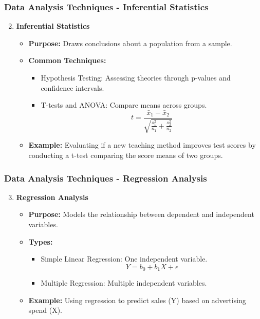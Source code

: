 \documentclass[aspectratio=169]{beamer}
\begin{document}
\begin{frame}[fragile]
    \frametitle{Data Analysis Techniques - Inferential Statistics}
    \begin{enumerate}
        \setcounter{enumi}{1}
        \item \textbf{Inferential Statistics}
        \begin{itemize}
            \item \textbf{Purpose:} Draws conclusions about a population from a sample.
            \item \textbf{Common Techniques:}
            \begin{itemize}
                \item Hypothesis Testing: Assessing theories through p-values and confidence intervals.
                \item T-tests and ANOVA: Compare means across groups.
                \begin{equation}
                    t = \frac{\bar{x}_1 - \bar{x}_2}{\sqrt{\frac{s_1^2}{n_1} + \frac{s_2^2}{n_2}}}
                \end{equation}
            \end{itemize}
            \item \textbf{Example:} Evaluating if a new teaching method improves test scores by conducting a t-test comparing the score means of two groups.
        \end{itemize}
    \end{enumerate}
\end{frame}

\begin{frame}[fragile]
    \frametitle{Data Analysis Techniques - Regression Analysis}
    \begin{enumerate}
        \setcounter{enumi}{2}
        \item \textbf{Regression Analysis}
        \begin{itemize}
            \item \textbf{Purpose:} Models the relationship between dependent and independent variables.
            \item \textbf{Types:}
            \begin{itemize}
                \item Simple Linear Regression: One independent variable.
                \begin{equation}
                    Y = b_0 + b_1X + \epsilon
                \end{equation}
                \item Multiple Regression: Multiple independent variables.
            \end{itemize}
            \item \textbf{Example:} Using regression to predict sales (Y) based on advertising spend (X).
        \end{itemize}
    \end{enumerate}
\end{frame}
\end{document}
